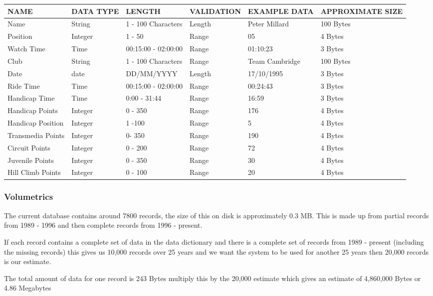 \begin{tabular}{|p{1.5cm}|p{1.5cm}|l|l|l|p{2.5cm}|}
	\hline
	NAME & DATA TYPE & LENGTH & VALIDATION & EXAMPLE DATA & APPROXIMATE SIZE \\ \hline
	Name & String & 1 - 100 Characters & Length & Peter Millard & 100 Bytes \\ \hline
	Position & Integer & 1 - 50 & Range & 05 & 4 Bytes \\ \hline
	Watch Time & Time & 00:15:00 - 02:00:00 & Range & 01:10:23 & 3 Bytes \\ \hline
	Club & String & 1 - 100 Characters & Range & Team Cambridge &  100 Bytes\\ \hline
	Date & date & DD/MM/YYYY & Length & 17/10/1995 & 3 Bytes \\ \hline
	Ride Time & Time & 00:15:00 - 02:00:00 & Range & 00:24:43 & 3 Bytes \\ \hline
	Handicap Time & Time & 0:00 - 31:44 & Range & 16:59 & 3 Bytes \\ \hline
	Handicap Points & Integer & 0 - 350 & Range & 176 & 4 Bytes \\ \hline
	Handicap Position & Integer & 1 -100 & Range & 5 & 4 Bytes \\ \hline
	Transmedia Points & Integer & 0- 350 & Range & 190& 4 Bytes \\ \hline
	Circuit Points & Integer & 0 - 200 & Range & 72 & 4 Bytes \\ \hline	
	Juvenile Points & Integer & 0 - 350 & Range & 30 & 4 Bytes \\ \hline
	Hill Climb Points & Integer & 0 - 100 & Range & 20 &  4 Bytes\\ \hline
\end{tabular}

\subsubsection{Volumetrics}
The current database contains around 7800 records, the size of this on disk is approximately 0.3 MB. This is made up from partial records from 1989 - 1996 and then complete records from 1996 - present.

If each record  contains a complete set of data in the data dictionary and there is a complete set of records from 1989 - present (including the missing records) this gives us 10,000 records over 25 years and we want the system to be used for another 25 years then 20,000 records is our estimate. 
 
The total amount of data for one record is 243 Bytes multiply this by the 20,000 estimate which gives an estimate of 4,860,000 Bytes or 4.86 Megabytes

